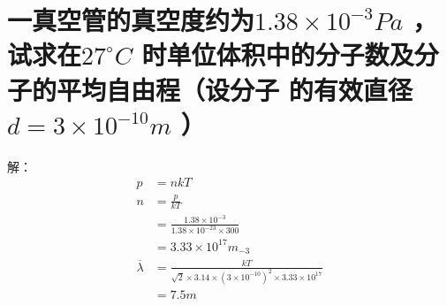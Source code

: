 \documentclass[lang=cn]{elegantpaper}
\begin{document}
\section{一真空管的真空度约为\(1.38\times 10^{-3} Pa\)
，试求在\(27^\circ C\)
时单位体积中的分子数及分子的平均自由程（设分子
的有效直径\(d = 3\times 10^{-10} m\)
）}

解：
\[
  \begin{align} 
    p &= nkT\\
    n &= \frac{p}{kT}\\
    &=\frac{1.38 \times 10^{-3}}{1.38 \times 10^{-23} \times 300}\\
    &= 3.33 \times 10^{17}m_{-3}\\
    \overline{\lambda } &= \frac{kT}{\sqrt{2} \times 3.14 \times (3 \times  10^{-10})^2 \times 3.33 \times 10^{17}}\\
    &= 7.5m\\
  \end{align}\]
\end{document}
